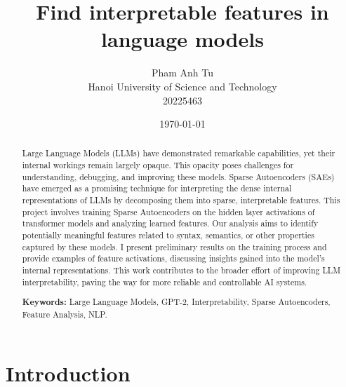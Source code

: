 \documentclass{article}
\title{Find interpretable features in language models}
\author{Pham Anh Tu\\
        Hanoi University of Science and Technology \\
        20225463 %
        }
\date{\today} %
\begin{document}
\maketitle

\begin{abstract}
Large Language Models (LLMs) have demonstrated remarkable capabilities, yet their internal workings remain largely opaque. This opacity poses challenges for understanding, debugging, and improving these models. Sparse Autoencoders (SAEs) have emerged as a promising technique for interpreting the dense internal representations of LLMs by decomposing them into sparse, interpretable features. This project involves training Sparse Autoencoders on the hidden layer activations of transformer models and analyzing learned features. Our analysis aims to identify potentially meaningful features related to syntax, semantics, or other properties captured by these models. I present preliminary results on the training process and provide examples of feature activations, discussing insights gained into the model's internal representations. This work contributes to the broader effort of improving LLM interpretability, paving the way for more reliable and controllable AI systems.

\vspace{0.5em}
\noindent\textbf{Keywords:} Large Language Models, GPT-2, Interpretability, Sparse Autoencoders, Feature Analysis, NLP.
\end{abstract}


\section{Introduction}

\end{document}
